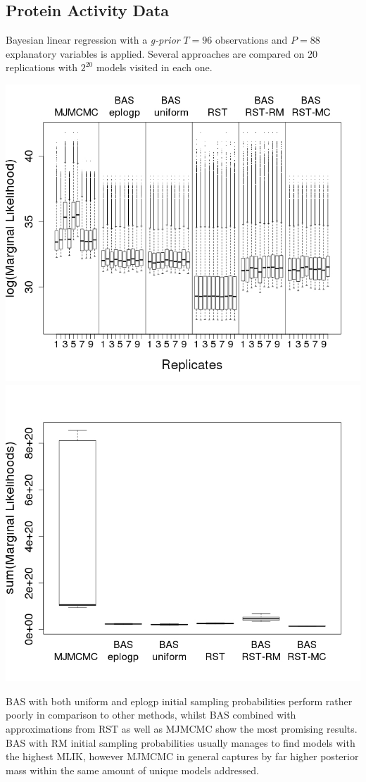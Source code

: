 \documentclass[a0,portrait]{a0poster}
\begin{document}
\begin{multicols}{2}
\subsection*{Protein Activity Data}
\color{DarkSlateGray} %
Bayesian linear regression with a \textit{g-prior} $T = 96$ observations and $P = 88$ explanatory variables is applied. Several approaches are compared on 20 replications with $2^{20}$ models visited in each one. 
\begin{center}\vspace{0cm}
\includegraphics[width=0.48\linewidth]{figures/mliks.jpeg}
\includegraphics[width=0.48\linewidth]{figures/massesbig.jpeg}\label{figmlikmass}
\end{center}\vspace{0.2cm}


BAS with both uniform and eplogp initial sampling probabilities perform rather poorly in comparison to other methods, whilst BAS combined with approximations from RST as well as MJMCMC show the most promising results. BAS with RM initial sampling probabilities usually manages to find models with the highest MLIK, however MJMCMC in general captures by far higher posterior mass within the same amount of unique models addressed.


\end{multicols}
\end{document}
